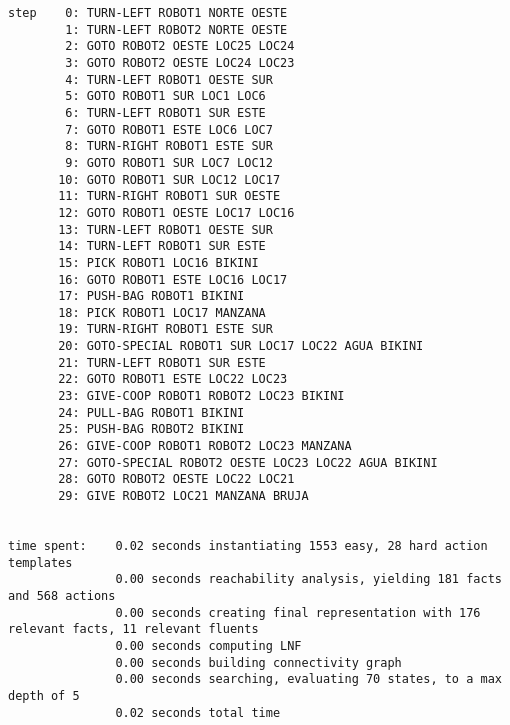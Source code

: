 \documentclass{article}
\begin{document}
\begin{lstlisting}
step    0: TURN-LEFT ROBOT1 NORTE OESTE
        1: TURN-LEFT ROBOT2 NORTE OESTE
        2: GOTO ROBOT2 OESTE LOC25 LOC24
        3: GOTO ROBOT2 OESTE LOC24 LOC23
        4: TURN-LEFT ROBOT1 OESTE SUR
        5: GOTO ROBOT1 SUR LOC1 LOC6
        6: TURN-LEFT ROBOT1 SUR ESTE
        7: GOTO ROBOT1 ESTE LOC6 LOC7
        8: TURN-RIGHT ROBOT1 ESTE SUR
        9: GOTO ROBOT1 SUR LOC7 LOC12
       10: GOTO ROBOT1 SUR LOC12 LOC17
       11: TURN-RIGHT ROBOT1 SUR OESTE
       12: GOTO ROBOT1 OESTE LOC17 LOC16
       13: TURN-LEFT ROBOT1 OESTE SUR
       14: TURN-LEFT ROBOT1 SUR ESTE
       15: PICK ROBOT1 LOC16 BIKINI
       16: GOTO ROBOT1 ESTE LOC16 LOC17
       17: PUSH-BAG ROBOT1 BIKINI
       18: PICK ROBOT1 LOC17 MANZANA
       19: TURN-RIGHT ROBOT1 ESTE SUR
       20: GOTO-SPECIAL ROBOT1 SUR LOC17 LOC22 AGUA BIKINI
       21: TURN-LEFT ROBOT1 SUR ESTE
       22: GOTO ROBOT1 ESTE LOC22 LOC23
       23: GIVE-COOP ROBOT1 ROBOT2 LOC23 BIKINI
       24: PULL-BAG ROBOT1 BIKINI
       25: PUSH-BAG ROBOT2 BIKINI
       26: GIVE-COOP ROBOT1 ROBOT2 LOC23 MANZANA
       27: GOTO-SPECIAL ROBOT2 OESTE LOC23 LOC22 AGUA BIKINI
       28: GOTO ROBOT2 OESTE LOC22 LOC21
       29: GIVE ROBOT2 LOC21 MANZANA BRUJA


time spent:    0.02 seconds instantiating 1553 easy, 28 hard action templates
               0.00 seconds reachability analysis, yielding 181 facts and 568 actions
               0.00 seconds creating final representation with 176 relevant facts, 11 relevant fluents
               0.00 seconds computing LNF
               0.00 seconds building connectivity graph
               0.00 seconds searching, evaluating 70 states, to a max depth of 5
               0.02 seconds total time
\end{lstlisting}
\end{document}

